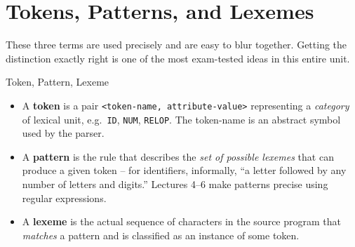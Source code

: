\documentclass[11pt]{article}
\begin{document}
\section{Tokens, Patterns, and Lexemes}

\dbtag These three terms are used precisely and are easy to blur together. Getting the
distinction exactly right is one of the most exam-tested ideas in this entire unit.

\begin{defbox}{Token, Pattern, Lexeme}
\begin{itemize}
  \item A \textbf{token} is a pair \texttt{<token-name, attribute-value>} representing a
  \emph{category} of lexical unit, e.g.\ \texttt{ID}, \texttt{NUM}, \texttt{RELOP}. The
  token-name is an abstract symbol used by the parser.
  \item A \textbf{pattern} is the rule that describes the \emph{set of possible lexemes} that
  can produce a given token -- for identifiers, informally, ``a letter followed by any number of
  letters and digits.'' Lectures 4--6 make patterns precise using regular expressions.
  \item A \textbf{lexeme} is the actual sequence of characters in the source program that
  \emph{matches} a pattern and is classified as an instance of some token.
\end{itemize}
\end{defbox}

\begin{center}
\end{center}
\end{document}
